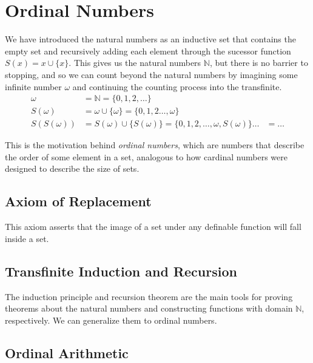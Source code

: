 \section{Ordinal Numbers} 

  We have introduced the natural numbers as an inductive set that contains the empty set and recursively adding each element through the sucessor function $S(x) = x \cup \{x\}$. This gives us the natural numbers $\mathbb{N}$, but there is no barrier to stopping, and so we can count beyond the natural numbers by imagining some infinite number $\omega$ and continuing the counting process into the transfinite. 
  \begin{align}
    \omega & = \mathbb{N} = \{0, 1, 2, \ldots \} \\ 
    S(\omega) & = \omega \cup \{\omega\} = \{0, 1, 2 \ldots, \omega\} \\
    S(S(\omega)) & = S(\omega) \cup \{S(\omega)\} = \{0, 1, 2, \ldots, \omega, S(\omega)\}
    \ldots & = \ldots 
  \end{align}

  This is the motivation behind \textit{ordinal numbers}, which are numbers that describe the order of some element in a set, analogous to how cardinal numbers were designed to describe the size of sets. 

\subsection{Axiom of Replacement}

  \begin{axiom}
    This axiom asserts that the image of a set under any definable function will fall inside a set. 
  \end{axiom}

\subsection{Transfinite Induction and Recursion} 

  The induction principle and recursion theorem are the main tools for proving theorems about the natural numbers and constructing functions with domain $\mathbb{N}$, respectively. We can generalize them to ordinal numbers. 

\subsection{Ordinal Arithmetic} 




